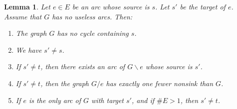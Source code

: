 \documentclass[12pt]{amsart}
\newtheorem{lemma}[theorem]{Lemma}
\theoremstyle{definition}
\begin{document}
\begin{lemma} \label{lem.G/e.basics}
    Let $e \in E$ be an arc whose source is $s$.
    Let $s'$ be the target of $e$.
    Assume that $G$ has no useless arcs.
    Then:
    
    \begin{enumerate}
    
    
    \item[(a)] The graph $G$ has no cycle containing $s$.
    
    \item[(b)] We have $s' \neq s$.
    

    \item[(c)] If $s' \neq t$, then there exists an arc
               of $G \backslash e$ whose source is $s'$.
    
    \item[(d)] If $s' \neq t$, then the graph $G / e$
               has exactly one fewer nonsink than $G$.
        

	
	\item[(e)] If $e$ is the only arc of $G$ with target $s'$,
               and if $\# E > 1$, then $s' \neq t$.
    
    \end{enumerate}
\end{lemma}
\end{document}
